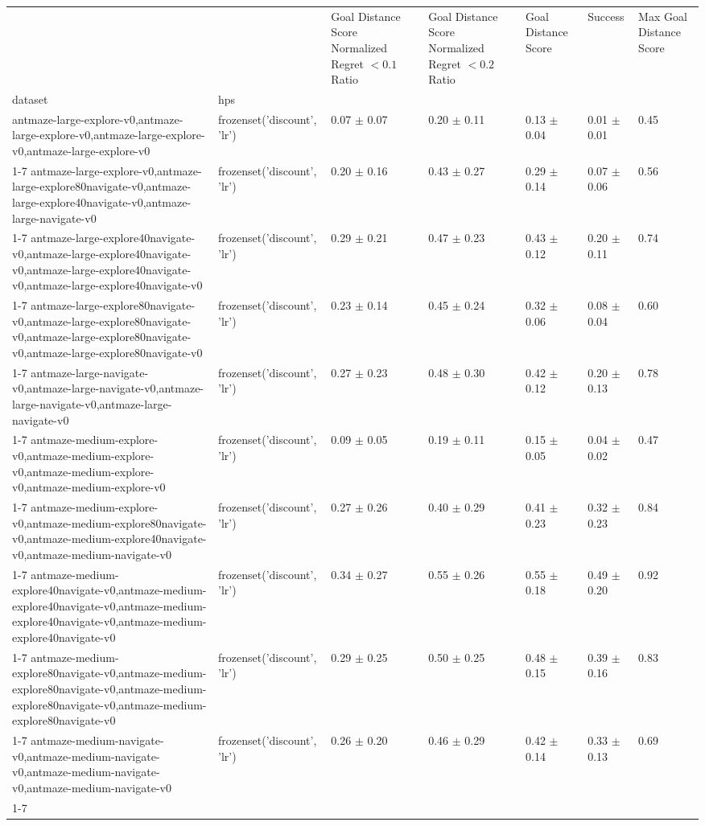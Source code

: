 \begin{tabular}{lllllll}
\toprule
 &  & Goal Distance Score Normalized Regret $< 0.1$ Ratio & Goal Distance Score Normalized Regret $< 0.2$ Ratio & Goal Distance Score & Success & Max Goal Distance Score \\
dataset & hps &  &  &  &  &  \\
\midrule
antmaze-large-explore-v0,antmaze-large-explore-v0,antmaze-large-explore-v0,antmaze-large-explore-v0 & frozenset({'discount', 'lr'}) & 0.07 $\pm$ 0.07 & 0.20 $\pm$ 0.11 & 0.13 $\pm$ 0.04 & 0.01 $\pm$ 0.01 & 0.45 \\
\cline{1-7}
antmaze-large-explore-v0,antmaze-large-explore80navigate-v0,antmaze-large-explore40navigate-v0,antmaze-large-navigate-v0 & frozenset({'discount', 'lr'}) & 0.20 $\pm$ 0.16 & 0.43 $\pm$ 0.27 & 0.29 $\pm$ 0.14 & 0.07 $\pm$ 0.06 & 0.56 \\
\cline{1-7}
antmaze-large-explore40navigate-v0,antmaze-large-explore40navigate-v0,antmaze-large-explore40navigate-v0,antmaze-large-explore40navigate-v0 & frozenset({'discount', 'lr'}) & 0.29 $\pm$ 0.21 & 0.47 $\pm$ 0.23 & 0.43 $\pm$ 0.12 & 0.20 $\pm$ 0.11 & 0.74 \\
\cline{1-7}
antmaze-large-explore80navigate-v0,antmaze-large-explore80navigate-v0,antmaze-large-explore80navigate-v0,antmaze-large-explore80navigate-v0 & frozenset({'discount', 'lr'}) & 0.23 $\pm$ 0.14 & 0.45 $\pm$ 0.24 & 0.32 $\pm$ 0.06 & 0.08 $\pm$ 0.04 & 0.60 \\
\cline{1-7}
antmaze-large-navigate-v0,antmaze-large-navigate-v0,antmaze-large-navigate-v0,antmaze-large-navigate-v0 & frozenset({'discount', 'lr'}) & 0.27 $\pm$ 0.23 & 0.48 $\pm$ 0.30 & 0.42 $\pm$ 0.12 & 0.20 $\pm$ 0.13 & 0.78 \\
\cline{1-7}
antmaze-medium-explore-v0,antmaze-medium-explore-v0,antmaze-medium-explore-v0,antmaze-medium-explore-v0 & frozenset({'discount', 'lr'}) & 0.09 $\pm$ 0.05 & 0.19 $\pm$ 0.11 & 0.15 $\pm$ 0.05 & 0.04 $\pm$ 0.02 & 0.47 \\
\cline{1-7}
antmaze-medium-explore-v0,antmaze-medium-explore80navigate-v0,antmaze-medium-explore40navigate-v0,antmaze-medium-navigate-v0 & frozenset({'discount', 'lr'}) & 0.27 $\pm$ 0.26 & 0.40 $\pm$ 0.29 & 0.41 $\pm$ 0.23 & 0.32 $\pm$ 0.23 & 0.84 \\
\cline{1-7}
antmaze-medium-explore40navigate-v0,antmaze-medium-explore40navigate-v0,antmaze-medium-explore40navigate-v0,antmaze-medium-explore40navigate-v0 & frozenset({'discount', 'lr'}) & 0.34 $\pm$ 0.27 & 0.55 $\pm$ 0.26 & 0.55 $\pm$ 0.18 & 0.49 $\pm$ 0.20 & 0.92 \\
\cline{1-7}
antmaze-medium-explore80navigate-v0,antmaze-medium-explore80navigate-v0,antmaze-medium-explore80navigate-v0,antmaze-medium-explore80navigate-v0 & frozenset({'discount', 'lr'}) & 0.29 $\pm$ 0.25 & 0.50 $\pm$ 0.25 & 0.48 $\pm$ 0.15 & 0.39 $\pm$ 0.16 & 0.83 \\
\cline{1-7}
antmaze-medium-navigate-v0,antmaze-medium-navigate-v0,antmaze-medium-navigate-v0,antmaze-medium-navigate-v0 & frozenset({'discount', 'lr'}) & 0.26 $\pm$ 0.20 & 0.46 $\pm$ 0.29 & 0.42 $\pm$ 0.14 & 0.33 $\pm$ 0.13 & 0.69 \\
\cline{1-7}
\bottomrule
\end{tabular}
